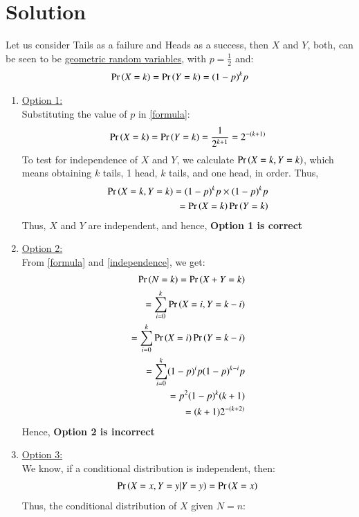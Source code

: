 \documentclass[journal,12pt,twocolumn]{IEEEtran}
\begin{document}
\section{Solution}
Let us consider Tails as a failure and Heads as a success, then $X$ and $Y$, both, can be seen to be \underline{geometric random variables}, with $p = \frac{1}{2}$ and:
\begin{align}
    \Pr\left(X = k\right) = \Pr\left(Y = k\right) = (1-p)^k p  
    \label{formula}
\end{align}
\begin{enumerate}
    \item \underline{Option 1:}\\
    
    Substituting the value of $p$ in \eqref{formula}:
{\small
\begin{align}
    \Pr\left(X = k\right) = \Pr\left(Y = k\right) = \frac{1}{2^{k+1}} = 2^{-(k+1)}
\end{align}
}
To test for independence of $X$ and $Y$, we calculate $\Pr\left(X = k, Y = k\right)$, which means obtaining $k$ tails, 1 head, $k$ tails, and one head, in order. Thus,
{\small
\begin{align}
    \Pr\left(X = k,Y = k\right) = (1-p)^k p \times (1-p)^k p\\
    =\Pr\left(X = k\right)\Pr\left(Y = k\right)
    \label{independence}
    \end{align}
    }
    Thus, $X$ and $Y$ are independent, and hence, \textbf{Option 1 is correct}\\

    \item \underline{Option 2:}\\
    
    From \eqref{formula} and \eqref{independence}, we get:
\begin{align}
    \Pr\left(N = k\right) = \Pr\left(X+Y = k\right)\\
    = \sum_{i=0}^k\Pr\left(X = i, Y = k-i\right) \\
    = \sum_{i=0}^k\Pr\left(X = i\right) \Pr\left(Y = k-i\right)\\
    =\sum_{i=0}^k (1-p)^i p (1-p)^{k-i} p\\
    = p^2(1-p)^k (k+1)\\
    =(k+1) 2^{-(k+2)}
\end{align}
Hence, \textbf{Option 2 is incorrect}\\

 \item \underline{Option 3:}\\
 
 We know, if a conditional distribution is independent, then:
\begin{align}
    \Pr\left(X = x,Y=y | Y=y\right) = \Pr\left(X=x\right)
\end{align}
Thus, the conditional distribution of $X$ given $N=n$:\\


\end{enumerate}
\end{document}
